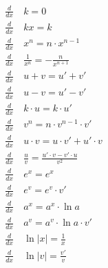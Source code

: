 \documentclass[11pt,letterpaper,oneside]{book}
\numberwithin{equation}{section}
\newcommand{\der}[1][x]{\frac{d}{d#1} }
\begin{document}
	\begin{minipage}{0.48\textwidth}
		\begin{align}
			\der \ &k = 0 \\
			\der \ &kx = k    \label{kx}\\   
			\der \ &x^n = n \cdot x^{n-1} \label{dptx} \\
			\der \ &\frac{1}{x^{n}} = - \frac{n}{x^{n+1}} \\
			\der \ &u + v = u' + v'  \label{dsum} \\
			\der \ &u - v = u' - v' \\
			\der \ &k\cdot u = k \cdot u' \\
			\der \ &v^n = n\cdot v^{n-1} \cdot v' \label{dvn} \\
			\der \ &u\cdot v  = u \cdot v' + u' \cdot v \\
			\der \ &\frac{u}{v} = \frac{u'\cdot v - v'\cdot u}{v^2} \\
			\der \ &e^x = e^x \\
			\der \ &e^v = e^v \cdot v' \\
			\der \ &a^x = a^x \cdot \operatorname{ln}a \\
			\der \ &a^v = a^v \cdot \operatorname{ln}a \cdot v' \\
			\der \ &\operatorname{ln} |x| = \frac{1}{x} \label{dlnx} \\
			\der \ &\operatorname{ln} |v| = \frac{v'}{v}
		\end{align}
	\end{minipage}
\end{document}
